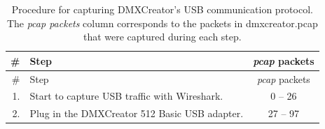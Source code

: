 \hypertarget{tbl:dmxcreator-wireshark-procedure}{}
\begin{longtable}[]{@{}rlc@{}}
\caption[Procedure for
capturing DMXCreator's USB communication protocol]{\label{tbl:dmxcreator-wireshark-procedure}Procedure for
capturing DMXCreator's USB communication protocol. The \emph{pcap
packets} column corresponds to the packets in \gls{dmxcreator.pcap} that
were captured during each step. }\tabularnewline
\toprule
\begin{minipage}[b]{0.05\columnwidth}\raggedleft\strut
\#\strut
\end{minipage} & \begin{minipage}[b]{0.74\columnwidth}\raggedright\strut
Step\strut
\end{minipage} & \begin{minipage}[b]{0.13\columnwidth}\centering\strut
\emph{pcap} packets\strut
\end{minipage}\tabularnewline
\midrule
\endfirsthead
\toprule
\begin{minipage}[b]{0.05\columnwidth}\raggedleft\strut
\#\strut
\end{minipage} & \begin{minipage}[b]{0.74\columnwidth}\raggedright\strut
Step\strut
\end{minipage} & \begin{minipage}[b]{0.13\columnwidth}\centering\strut
\emph{pcap} packets\strut
\end{minipage}\tabularnewline
\midrule
\endhead
\begin{minipage}[t]{0.05\columnwidth}\raggedleft\strut
1.\strut
\end{minipage} & \begin{minipage}[t]{0.74\columnwidth}\raggedright\strut
Start to capture USB traffic with Wireshark.\strut
\end{minipage} & \begin{minipage}[t]{0.13\columnwidth}\centering\strut
0 -- 26\strut
\end{minipage}\tabularnewline
\begin{minipage}[t]{0.05\columnwidth}\raggedleft\strut
2.\strut
\end{minipage} & \begin{minipage}[t]{0.74\columnwidth}\raggedright\strut
Plug in the DMXCreator 512 Basic USB adapter.\strut
\end{minipage} & \begin{minipage}[t]{0.13\columnwidth}\centering\strut
27 -- 97\strut
\end{minipage}\tabularnewline

\end{longtable}
